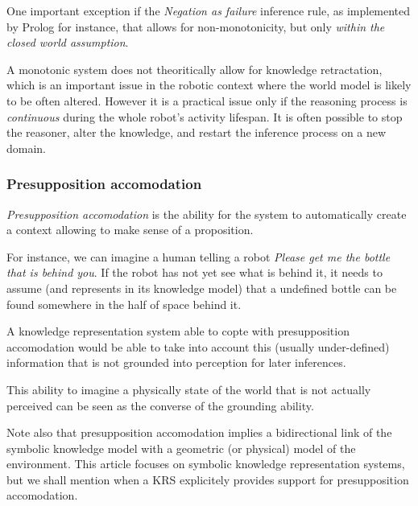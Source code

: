 \documentclass[a4paper, twocolumn]{article}
\begin{document}

One important exception if the \emph{Negation as failure} inference rule, as
implemented by {\sc Prolog} for instance, that allows for non-monotonicity, but
only \emph{within the closed world assumption}.


A monotonic system does not theoritically allow for knowledge retractation,
which is an important issue in the robotic context where the world model is
likely to be often altered.  However it is a practical issue only if the
reasoning process is \emph{continuous} during the whole robot's activity
lifespan. It is often possible to stop the reasoner, alter the knowledge, and
restart the inference process on a new domain.



\subsubsection{Presupposition accomodation}
\label{sect|presupposition-accomodation}

\emph{Presupposition accomodation} is the ability for the system to
automatically create a context allowing to make sense of a proposition.

For instance, we can imagine a human telling a robot \emph{Please get me the
bottle that is behind you}. If the robot has not yet see what is behind it, it
needs to assume (and represents in its knowledge model) that a undefined bottle
can be found somewhere in the half of space behind it.

A knowledge representation system able to copte with presupposition
accomodation would be able to take into account this (usually under-defined)
information that is not grounded into perception for later inferences.

This ability to imagine a physically state of the world that is not actually
perceived can be seen as the converse of the grounding ability.

Note also that presupposition accomodation implies a bidirectional link of the
symbolic knowledge model with a geometric (or physical) model of the
environment. This article focuses on symbolic knowledge representation systems,
but we shall mention when a KRS explicitely provides support for presupposition
accomodation.
\end{document}
